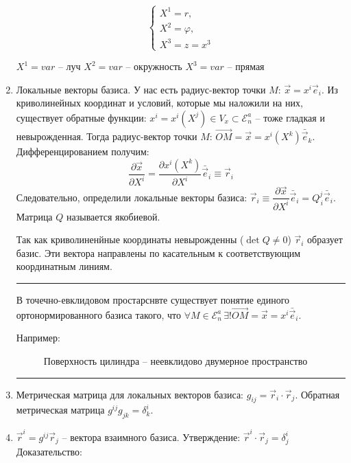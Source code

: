 \begin{enumerate}
\begin{example}
		\[
		\begin{cases}
			X^1 = r, \\
			X^2 = \varphi, \\
			X^3 = z = x^3
		\end{cases}
		\]
		
		$X^1 = var$ -- луч
		$X^2 = var$ -- окружность
		$X^3 = var$ -- прямая
	\end{example}
    

  \item Локальные векторы базиса. У нас есть радиус-вектор точки $M$: $\vec{x} = x^i \vec{e}_i$. 
    Из криволинейных координат и условий, которые мы наложили на них, существует обратные функции:
    $x^i = x^i(X^j) \in V_x \subset \mathcal{E}_n^a$ -- тоже гладкая и невырожденная. Тогда 
    радиус-вектор точки $M$: $\vec{OM} = \vec{x} = x^i(X^k) \bar{\vec{e}}_k$. Дифференцированием
    получим:
    \[
      \dfrac{\partial \vec{x}}{\partial X^i} = \dfrac{\partial x^i (X^k)}{\partial X^i} \bar{\vec{e}}_i
      \equiv \vec{r}_i
    \]
    Следовательно, определили локальные векторы базиса: 
    $\vec{r}_i \equiv \dfrac{\partial \vec{x}}{\partial X^i} \bar{\vec{e}}_i
    = Q^j_{\, i} \bar{\vec{e}}_i$. Матрица $Q$ называется якобиевой.

    Так как криволиненйные координаты невырожденны ($\det Q \neq 0$) $\vec{r}_i$ образует 
    базис. Эти вектора направлены по касательным к соответствующим координатным линиям.
    
	\rule{0.95\textwidth}{0.4pt}
	
    В точечно-евклидовом простарснвте существует понятие единого ортонормированного базиса такого,
    что $\forall M \in \mathcal{E}_n^a \, \exists! \vec{OM} = \vec{x} = x^i \bar{\vec{e}}_i$.
    
    \begin{example} \label{cilinder_surface}
    	Например:
    	\begin{figure}[H]
    		\centering
    		
    		\caption{Поверхность цилиндра -- неевклидово двумерное пространство}
    	\end{figure}
    \end{example}
    
    \rule{0.95\textwidth}{0.4pt}

  \item Метрическая матрица для локальных векторов базиса: $g_{ij} = \vec{r}_i \cdot \vec{r}_j$. 
    Обратная метрическая матрица $g^{ij} g_{jk} = \delta^i_k$.

  \item $\vec{r}^i = g^{ij} \vec{r}_j$ -- вектора взаимного базиса.
    Утверждение: $\vec{r}^i \cdot \vec{r}_j = \delta^i_j$
    Доказательство: 
\end{enumerate}

